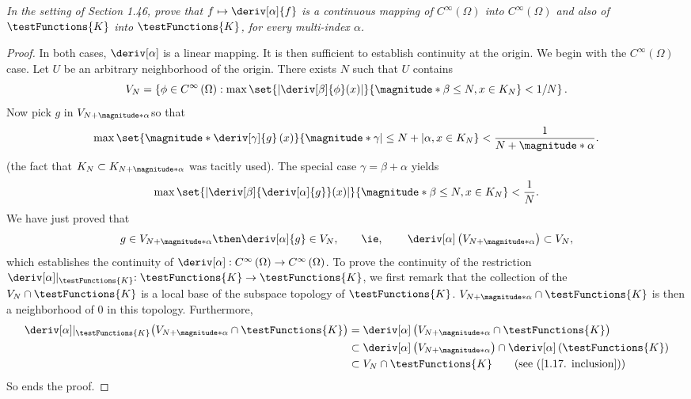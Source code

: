 \textit{In the setting of Section 1.46, prove that 
    $f \mapsto \deriv[\alpha]{f}$
is a continuous mapping of 
%
  $C^{\infty}\left(\Omega\right)$ into 
  $C^{\infty}\left(\Omega\right)$ and also of 
  $\testFunctions{K}$ into 
  $\testFunctions{K}$, for every multi-index $\alpha$.
%
}
\begin{proof} 
In both cases, $\deriv[\alpha]$ is a linear mapping.
It is then sufficient to establish continuity at the origin.
%
We begin with the $C^\infty\left(\Omega\right)$ case.
\skipline
Let $U$ be an arbitrary neighborhood of the origin.
There exists $N$ such that $U$ contains
%
  \begin{equation} 
    V_{N}= \left\{
      \phi \in C^\infty\left(\Omega\right): 
      \max\set{
        | \deriv[\beta]{\phi}(x) |
      }{
        \magnitude*{ \beta } \leq N, x\in K_N
      }
    < 1/N
    \right\}.
  \end{equation}
%
Now pick $g$ in $V_{N+\magnitude*{\alpha}}$so that
%
  \begin{equation}
    \max
    \set{
      \magnitude*{ \deriv[\gamma]{g}\left(x\right) }
    }{
      \magnitude*{ \gamma | \leq N+| \alpha }, 
      x\in K_{N}
    }
    < \frac{1}{N+\magnitude*{\alpha}}.
  \end{equation}
%
(the fact that $K_N\subset K_{N+\magnitude*{\alpha}}$ was tacitly used).
%
The special case $\gamma = \beta + \alpha$ yields
\begin{equation}
    \max
    \set{
      | \deriv[\beta]{\deriv[\alpha]{g}}(x)|
    }{
      \magnitude*{\beta} \leq N, 
      x\in K_{N}
    }
    < \frac{1}{N}.
  \end{equation}
%
We have just proved that
%
  \begin{equation}\label{1.17. inclusion}
    g \in V_{N + \magnitude*{\alpha}}
      \then
    \deriv[\alpha]{g} \in V_{N},
      \qquad
      \text{\ie, }
      \qquad
    \deriv[\alpha] \left(V_{N+\magnitude*{\alpha}}\right) \subset V_N,
  \end{equation}
%
which establishes the continuity of %
%
  $\deriv[\alpha]: C^\infty \left(\Omega\right)\to C^\infty \left(\Omega\right)$. %
%
\skipline
To prove the continuity of the restriction 
%
  $\deriv[\alpha] \lvert_{\testFunctions{K}}: \testFunctions{K} \to \testFunctions{K}$, %
%
%
we first remark that the collection of the  
%
  ${V_N \cap \testFunctions{K}}$ %
%
is a local base of the subspace topology of $\testFunctions{K}$.
%
%
  $V_{N+\magnitude*{\alpha}} \cap \testFunctions{K}$ %
%
is then a neighborhood of $0$ in this topology. %
Furthermore, 
%
  \begin{align}
    \deriv[\alpha] \lvert_{\testFunctions{K}} \left(V_{N+\magnitude*{\alpha}} \cap \testFunctions{K}\right)
    & =
      \deriv[\alpha]\left(V_{N+\magnitude*{\alpha}} \cap \testFunctions{K}\right) \\
    & \subset
      \deriv[\alpha]\left(V_{N+\magnitude*{\alpha}}\right)
        \cap
      \deriv[\alpha]\left(\testFunctions{K}\right) \\
    & \subset 
      V_N 
        \cap 
      \testFunctions{K}
          \qquad (\text{see }(\ref{1.17. inclusion}))
  \end{align}
%
So ends the proof.
\end{proof}
